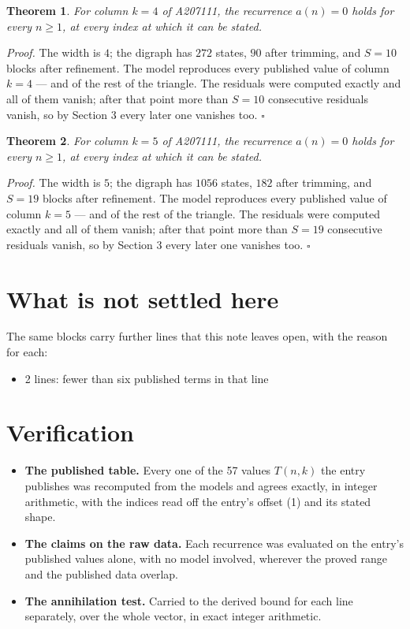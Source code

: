 \documentclass[11pt]{article}
\newtheorem{theorem}{Theorem}
\theoremstyle{definition}
\begin{document}
\begin{theorem} For column $k = 4$ of A207111, the recurrence $a(n) = 0$ holds for every $n \ge 1$, at every index at which it can be stated.\end{theorem}

{\itshape Proof.} The width is $4$; the digraph has $272$ states, $90$ after trimming, and $S = 10$ blocks after refinement. The model reproduces every published value of column $k = 4$ --- and of the rest of the triangle. The residuals were computed exactly and all of them vanish; after that point more than $S = 10$ consecutive residuals vanish, so by Section 3 every later one vanishes too. $\square$

\begin{theorem} For column $k = 5$ of A207111, the recurrence $a(n) = 0$ holds for every $n \ge 1$, at every index at which it can be stated.\end{theorem}

{\itshape Proof.} The width is $5$; the digraph has $1056$ states, $182$ after trimming, and $S = 19$ blocks after refinement. The model reproduces every published value of column $k = 5$ --- and of the rest of the triangle. The residuals were computed exactly and all of them vanish; after that point more than $S = 19$ consecutive residuals vanish, so by Section 3 every later one vanishes too. $\square$

\section{What is not settled here}

The same blocks carry further lines that this note leaves open, with the reason for each:

\begin{itemize}

\item 2 lines: fewer than six published terms in that line

\end{itemize}

\section{Verification}

\begin{itemize}

\item {\bfseries The published table.} Every one of the 57 values $T(n,k)$ the entry publishes was recomputed from the models and agrees exactly, in integer arithmetic, with the indices read off the entry's offset (1) and its stated shape.

\item {\bfseries The claims on the raw data.} Each recurrence was evaluated on the entry's published values alone, with no model involved, wherever the proved range and the published data overlap.

\item {\bfseries The annihilation test.} Carried to the derived bound for each line separately, over the whole vector, in exact integer arithmetic.

\end{itemize}
\end{document}
